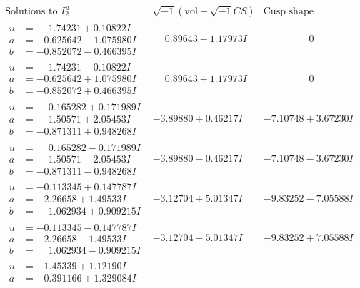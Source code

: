 \documentclass[1p]{elsarticle_modified}
\theoremstyle{definition}
\newcommand{\I}{\sqrt{-1}}
\begin{document}
$$\begin{array}{c|c|c}
\text{Solutions to }I^u_{2}& \I (\text{vol} + \sqrt{-1}CS) & \text{Cusp shape}\\
 \hline 
\begin{aligned}
u &= \phantom{-}1.74231 + 0.10822 I \\
a &= -0.625642 - 1.075980 I \\
b &= -0.852072 - 0.466395 I\end{aligned}
 & \phantom{-}0.89643 - 1.17973 I & \phantom{-0.000000 } 0 \\ \hline\begin{aligned}
u &= \phantom{-}1.74231 - 0.10822 I \\
a &= -0.625642 + 1.075980 I \\
b &= -0.852072 + 0.466395 I\end{aligned}
 & \phantom{-}0.89643 + 1.17973 I & \phantom{-0.000000 } 0 \\ \hline\begin{aligned}
u &= \phantom{-}0.165282 + 0.171989 I \\
a &= \phantom{-}1.50571 + 2.05453 I \\
b &= -0.871311 + 0.948268 I\end{aligned}
 & -3.89880 + 0.46217 I & -7.10748 + 3.67230 I \\ \hline\begin{aligned}
u &= \phantom{-}0.165282 - 0.171989 I \\
a &= \phantom{-}1.50571 - 2.05453 I \\
b &= -0.871311 - 0.948268 I\end{aligned}
 & -3.89880 - 0.46217 I & -7.10748 - 3.67230 I \\ \hline\begin{aligned}
u &= -0.113345 + 0.147787 I \\
a &= -2.26658 + 1.49533 I \\
b &= \phantom{-}1.062934 + 0.909215 I\end{aligned}
 & -3.12704 + 5.01347 I & -9.83252 - 7.05588 I \\ \hline\begin{aligned}
u &= -0.113345 - 0.147787 I \\
a &= -2.26658 - 1.49533 I \\
b &= \phantom{-}1.062934 - 0.909215 I\end{aligned}
 & -3.12704 - 5.01347 I & -9.83252 + 7.05588 I \\ \hline\begin{aligned}
u &= -1.45339 + 1.12190 I \\
a &= -0.391166 + 1.329084 I \\

\end{aligned}
\end{array}$$
\end{document}
